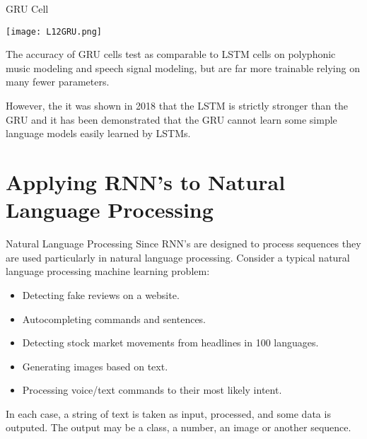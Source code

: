 \documentclass[10pt, table, dvipsnames,xcdraw, handout]{beamer}
\begin{document}
\begin{frame}[fragile]{GRU Cell}
  \begin{minipage}[t][0.5\textheight][t]{\textwidth}
	\centering \texttt{[image: L12GRU.png]} 
  \end{minipage}
  \vfill
\begin{minipage}[t][0.5\textheight][t]{\textwidth}
The accuracy of GRU cells test as comparable to LSTM cells on polyphonic music modeling and speech signal modeling, but are far more trainable relying on many fewer parameters. \pause \newline 

However, the it was shown in 2018 that the LSTM is strictly stronger than the GRU and it has been demonstrated that the GRU cannot learn some simple language models easily learned by LSTMs. 
\end{minipage}
\end{frame}


\section{Applying RNN's to Natural Language Processing}


\begin{frame}[fragile]{Natural Language Processing}
Since RNN's are designed to process sequences they are used particularly in natural language processing. Consider a typical natural language processing machine learning problem:

\begin{itemize}
\item Detecting fake reviews on a website. \pause
\item Autocompleting commands and sentences.\pause
\item Detecting stock market movements from headlines in 100 languages. \pause
\item Generating images based on text. \pause
\item Processing voice/text commands to their most likely intent. \pause
\end{itemize}

In each case, a string of text is taken as input, processed, and some data is outputed. The output may be a class, a number, an image or another sequence. 
\end{frame}
\end{document}
